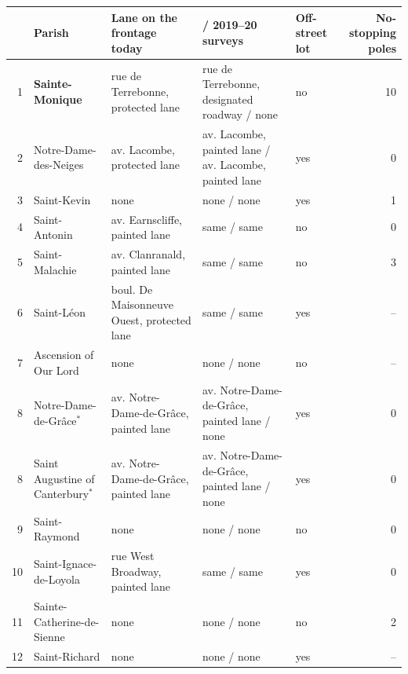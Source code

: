 \begin{tabular}{@{}r>{\raggedright\arraybackslash}p{3.4cm}>{\raggedright\arraybackslash}p{4.2cm}>{\raggedright\arraybackslash}p{4.4cm}>{\raggedright\arraybackslash}p{1.7cm}r@{}}\toprule
 & Parish & Lane on the frontage today & 2024 / 2019--20 surveys & Off-street lot & No-stopping poles \\\midrule
1 & \textbf{Sainte-Monique} & rue de Terrebonne, protected lane & rue de Terrebonne, designated roadway / none & no & 10 \\
2 & Notre-Dame-des-Neiges & av. Lacombe, protected lane & av. Lacombe, painted lane / av. Lacombe, painted lane & yes & 0 \\
3 & Saint-Kevin & none & none / none & yes & 1 \\
4 & Saint-Antonin & av. Earnscliffe, painted lane & same / same & no & 0 \\
5 & Saint-Malachie & av. Clanranald, painted lane & same / same & no & 3 \\
6 & Saint-Léon & boul. De Maisonneuve Ouest, protected lane & same / same & yes & -- \\
7 & Ascension of Our Lord & none & none / none & no & -- \\
8 & Notre-Dame-de-Grâce$^{*}$ & av. Notre-Dame-de-Grâce, painted lane & av. Notre-Dame-de-Grâce, painted lane / none & yes & 0 \\
8 & Saint Augustine of Canterbury$^{*}$ & av. Notre-Dame-de-Grâce, painted lane & av. Notre-Dame-de-Grâce, painted lane / none & yes & 0 \\
9 & Saint-Raymond & none & none / none & no & 0 \\
10 & Saint-Ignace-de-Loyola & rue West Broadway, painted lane & same / same & yes & 0 \\
11 & Sainte-Catherine-de-Sienne & none & none / none & no & 2 \\
12 & Saint-Richard & none & none / none & yes & -- \\
\bottomrule
\end{tabular}
